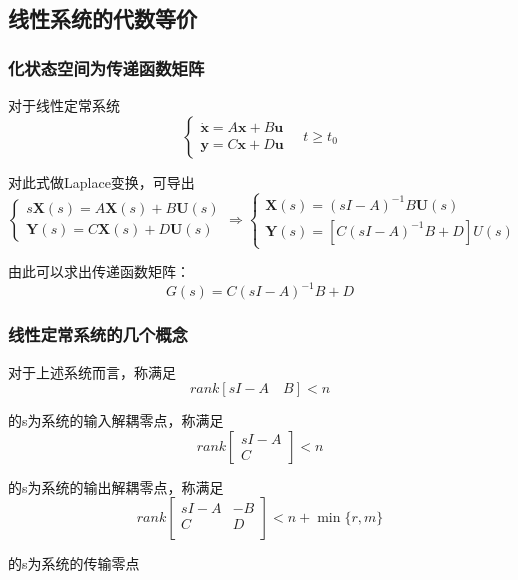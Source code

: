 \subsection{线性系统的代数等价}
\subsubsection{化状态空间为传递函数矩阵}

对于线性定常系统
\begin{equation*}
    \begin{cases}
        \dot{\bm{x}} = A \bm{x} + B \bm{u} \\
        \bm{y} = C \bm{x} + D \bm{u} 
    \end{cases}\quad t\geq t_0
\end{equation*}

对此式做Laplace变换，可导出
\begin{equation*}
    \begin{cases}
        s\bm{X}(s) = A \bm{X}(s) + B \bm{U}(s) \\
        \bm{Y} (s) = C \bm{X}(s) + D \bm{U}(s)  
    \end{cases}
    \Rightarrow 
    \begin{cases}
        \bm{X} (s) = (sI-A)^{-1} B\bm{U}(s) \\
        \bm{Y} (s) = [C (sI-A) ^{-1}B + D]U(s)
    \end{cases}
\end{equation*}

由此可以求出传递函数矩阵：
\begin{equation*}
    G(s) = C(sI - A)^{-1} B + D
\end{equation*}

\subsubsection{线性定常系统的几个概念}

\begin{definition}
    对于上述系统而言，称满足
    \begin{equation*}
        rank[sI-A \quad B] <n
    \end{equation*}

    的s为系统的输入解耦零点，称满足
    \begin{equation*}
        rank\left[
            \begin{array}{c}
                sI-A \\ C
            \end{array}
        \right]<n
    \end{equation*}

    的s为系统的输出解耦零点，称满足
    \begin{equation*}
        rank\left[
            \begin{array}{cc}
                sI-A & -B \\
                C & D \\
            \end{array}
        \right] <n + \min \{r,m\}
    \end{equation*}

    的s为系统的传输零点
\end{definition}

